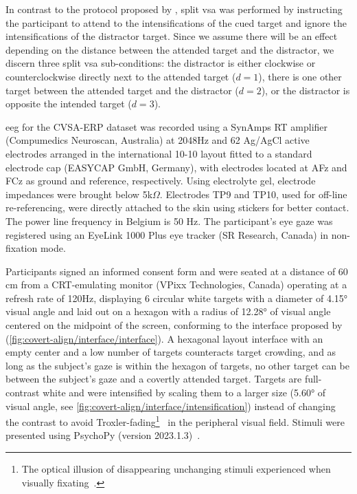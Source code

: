 In contrast to the protocol proposed by \textcite{Frenzel2011}, split \ac{vsa} was
performed by instructing the participant to attend to the intensifications of the
cued target and ignore the intensifications of the distractor target.
Since we assume there will be an effect depending on the distance between
the attended target and the distractor, we discern three split \ac{vsa} sub-conditions:
the distractor is either clockwise or counterclockwise directly next to the
attended target ($d=1$), there is one other target between the attended target and
the distractor ($d=2$), or the distractor is opposite the intended target
($d=3$).

\ac{eeg} for the CVSA-ERP dataset was recorded using a SynAmps RT amplifier
(Compumedics Neuroscan, Australia) at 2048Hz and 62 Ag/AgCl active electrodes arranged in the
international 10-10 layout fitted to a standard electrode cap (EASYCAP GmbH,
Germany), with electrodes located at AFz and FCz as ground and reference, respectively.
Using electrolyte gel, electrode impedances were brought below 5k$\Omega$.
Electrodes TP9 and TP10, used for off-line re-referencing, were directly
attached to the skin using stickers for better contact.
The power line frequency in Belgium is 50 Hz.
The participant's eye gaze was registered using an EyeLink 1000 Plus eye tracker (SR Research,
Canada) in non-fixation mode.

Participants signed an informed consent form and were seated at a distance of
60 cm from a CRT-emulating monitor (VPixx
Technologies, Canada) operating at a refresh rate of 120Hz, displaying 6
circular white targets with a diameter of 4.15° visual angle and laid out on a hexagon
with a radius of 12.28° of visual angle centered on the midpoint of the screen,
conforming to the interface proposed by \textcite{Treder2010}
(\cref{fig:covert-align/interface/interface}).
A hexagonal layout interface with an empty center and a low number of targets
counteracts target crowding, and as long as the subject’s gaze is within the hexagon of
targets, no other target can be between the subject’s gaze and a covertly
attended target.
Targets are full-contrast white and were intensified by scaling them to a
larger size (5.60° of visual angle, see \cref{fig:covert-align/interface/intensification})
instead of changing the contrast to avoid Troxler-fading\footnote{The optical illusion of disappearing unchanging stimuli
experienced when visually fixating~\cite{Troxler1804}.}~\cite{Treder2010} in the
peripheral visual field.
Stimuli were presented using PsychoPy (version 2023.1.3)~\cite{Peirce2019}.

